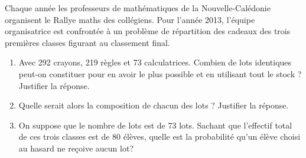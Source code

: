 
\medskip 

Chaque année les professeurs de mathématiques de la Nouvelle-Calédonie organisent le Rallye maths des collégiens. Pour l'année 2013, l'équipe organisatrice est confrontée à un problème de répartition des cadeaux des trois premières classes figurant au classement final. 

\medskip

\begin{enumerate}
\item Avec 292 crayons, 219 règles et 73 calculatrices. Combien de lots identiques peut-on constituer pour en avoir le plus possible et en utilisant tout le stock ? Justifier la réponse. 
\item Quelle serait alors la composition de chacun des lots ? Justifier la réponse. 
\item On suppose que le nombre de lots est de 73 lots. Sachant que l'effectif total de ces trois classes est de 80 élèves, quelle est la probabilité qu'un élève choisi au hasard ne reçoive aucun lot? 
\end{enumerate}

\vspace{0,5cm}

